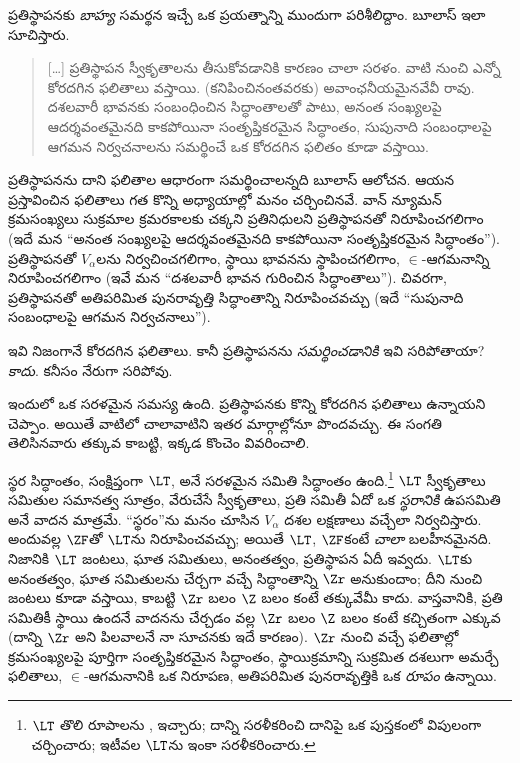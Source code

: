 \documentclass[../../../include/open-logic-section]{subfiles}
\begin{document}

ప్రతిస్థాపనకు \emph{బాహ్య} సమర్థన ఇచ్చే ఒక ప్రయత్నాన్ని
ముందుగా పరిశీలిద్దాం. బూలాస్ ఇలా సూచిస్తారు.
\begin{quote}
  [\ldots] ప్రతిస్థాపన స్వీకృతాలను తీసుకోవడానికి కారణం
  చాలా సరళం. వాటి నుంచి ఎన్నో కోరదగిన ఫలితాలు వస్తాయి.
  (కనిపించినంతవరకు) అవాంఛనీయమైనవేవీ రావు. దశలవారీ
  భావనకు సంబంధించిన సిద్ధాంతాలతో పాటు, అనంత సంఖ్యలపై
  ఆదర్శవంతమైనది కాకపోయినా సంతృప్తికరమైన సిద్ధాంతం,
  సుపునాది సంబంధాలపై ఆగమన నిర్వచనాలను సమర్థించే ఒక
  కోరదగిన ఫలితం కూడా వస్తాయి.
  \citep[229]{Boolos1971}
\end{quote}
ప్రతిస్థాపనను దాని ఫలితాల ఆధారంగా సమర్థించాలన్నది బూలాస్
ఆలోచన. ఆయన ప్రస్తావించిన ఫలితాలు గత కొన్ని అధ్యాయాల్లో
మనం చర్చించినవే. వాన్ న్యూమన్ క్రమసంఖ్యలు సుక్రమాల క్రమరకాలకు
చక్కని ప్రతినిధులని ప్రతిస్థాపనతో నిరూపించగలిగాం (ఇదే మన
``అనంత సంఖ్యలపై ఆదర్శవంతమైనది కాకపోయినా సంతృప్తికరమైన సిద్ధాంతం'').
ప్రతిస్థాపనతో $V_\alpha$లను నిర్వచించగలిగాం, స్థాయి భావనను
స్థాపించగలిగాం, $\in$-ఆగమనాన్ని నిరూపించగలిగాం (ఇవే మన
``దశలవారీ భావన గురించిన సిద్ధాంతాలు''). చివరగా, ప్రతిస్థాపనతో
అతిపరిమిత పునరావృత్తి సిద్ధాంతాన్ని నిరూపించవచ్చు (ఇదే
``సుపునాది సంబంధాలపై ఆగమన నిర్వచనాలు'').

ఇవి నిజంగానే కోరదగిన ఫలితాలు. కానీ ప్రతిస్థాపనను \emph{సమర్థించడానికి} ఇవి సరిపోతాయా? \emph{కాదు}. కనీసం నేరుగా సరిపోవు.

ఇందులో ఒక సరళమైన సమస్య ఉంది. ప్రతిస్థాపనకు కొన్ని కోరదగిన
ఫలితాలు ఉన్నాయని చెప్పాం. అయితే వాటిలో చాలావాటిని ఇతర
మార్గాల్లోనూ పొందవచ్చు. ఈ సంగతి తెలిసినవారు తక్కువ కాబట్టి,
ఇక్కడ కొంచెం వివరించాలి.

స్థర సిద్ధాంతం, సంక్షిప్తంగా $\LT$, అనే సరళమైన సమితి సిద్ధాంతం ఉంది.\footnote{$\LT$ తొలి రూపాలను \citet{Montague1965}, \citet{Scott1974} ఇచ్చారు; \citet{Potter2004} దాన్ని సరళీకరించి దానిపై ఒక పుస్తకంలో విపులంగా చర్చించారు; ఇటీవల \citet{ButtonLT1} $\LT$ను ఇంకా సరళీకరించారు.} $\LT$ స్వీకృతాలు సమితుల సమానత్వ సూత్రం, వేరుచేసే స్వీకృతాలు, ప్రతి సమితీ ఏదో ఒక \emph{స్థరానికి} ఉపసమితి అనే వాదన మాత్రమే. ``స్థరం''ను మనం చూసిన $V_\alpha$ దశల లక్షణాలు వచ్చేలా నిర్వచిస్తారు. అందువల్ల $\ZF$తో $\LT$ను నిరూపించవచ్చు; అయితే $\LT$, $\ZF$కంటే \emph{చాలా} బలహీనమైనది. నిజానికి $\LT$ జంటలు, ఘాత సమితులు, అనంతత్వం, ప్రతిస్థాపన ఏదీ ఇవ్వదు. $\LT$కు అనంతత్వం, ఘాత సమితులను చేర్చగా వచ్చే సిద్ధాంతాన్ని $\Zr$ అనుకుందాం; దీని నుంచి జంటలు కూడా వస్తాయి, కాబట్టి $\Zr$ బలం $\Z$ బలం కంటే తక్కువేమీ కాదు. వాస్తవానికి, ప్రతి సమితికీ స్థాయి ఉందనే వాదనను చేర్చడం వల్ల $\Zr$ బలం $\Z$ బలం కంటే కచ్చితంగా ఎక్కువ (దాన్ని $\Zr$ అని పిలవాలనే నా సూచనకు ఇదే కారణం). $\Zr$ నుంచి వచ్చే ఫలితాల్లో క్రమసంఖ్యలపై పూర్తిగా సంతృప్తికరమైన సిద్ధాంతం,
స్థాయిక్రమాన్ని సుక్రమిత దశలుగా అమర్చే ఫలితాలు,
$\in$-ఆగమనానికి ఒక నిరూపణ, అతిపరిమిత పునరావృత్తికి ఒక \emph{రూపం} ఉన్నాయి.
\end{document}
